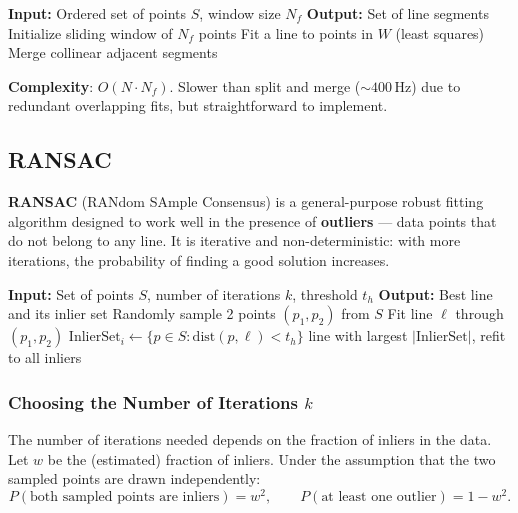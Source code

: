 \documentclass[11pt,a4paper]{article}
\theoremstyle{definition}
\theoremstyle{plain}
\theoremstyle{remark}
\begin{document}
\begin{algorithm}
\caption{Line Regression}
\begin{algorithmic}
\STATE \textbf{Input:} Ordered set of points $S$, window size $N_f$
\STATE \textbf{Output:} Set of line segments
\STATE Initialize sliding window of $N_f$ points
    \STATE Fit a line to points in $W$ (least squares)
\ENDFOR
\STATE Merge collinear adjacent segments
\end{algorithmic}
\end{algorithm}

\textbf{Complexity}: $O(N \cdot N_f)$. Slower than split and merge ($\sim 400\,\text{Hz}$) due to redundant overlapping fits, but straightforward to implement.

\subsection{RANSAC}

\textbf{RANSAC} (RANdom SAmple Consensus) is a general-purpose robust fitting algorithm designed to work well in the presence of \textbf{outliers} — data points that do not belong to any line. It is iterative and non-deterministic: with more iterations, the probability of finding a good solution increases.

\begin{algorithm}
\caption{RANSAC for Line Extraction}
\begin{algorithmic}
\STATE \textbf{Input:} Set of points $S$, number of iterations $k$, threshold $t_h$
\STATE \textbf{Output:} Best line and its inlier set
    \STATE Randomly sample 2 points $(p_1, p_2)$ from $S$
    \STATE Fit line $\ell$ through $(p_1, p_2)$
    \STATE $\mathrm{InlierSet}_i \leftarrow \{p \in S : \mathrm{dist}(p, \ell) < t_h\}$
\ENDFOR
\RETURN line with largest $|\mathrm{InlierSet}|$, refit to all inliers
\end{algorithmic}
\end{algorithm}

\subsubsection*{Choosing the Number of Iterations $k$}

The number of iterations needed depends on the fraction of inliers in the data. Let $w$ be the (estimated) fraction of inliers. Under the assumption that the two sampled points are drawn independently:
\[
P(\text{both sampled points are inliers}) = w^2, \qquad P(\text{at least one outlier}) = 1 - w^2.
\]
\end{document}
